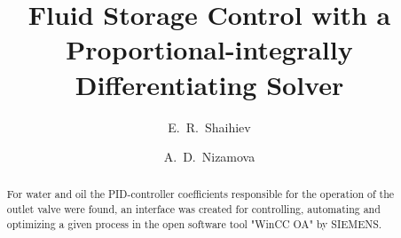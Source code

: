 \begin{englishtitle} %
\title{Fluid Storage Control with a Proportional-integrally Differentiating Solver}
\author{E.~R.~Shaihiev
  \and
  A.~D.~Nizamova
 }

\maketitle

\begin{abstract}
For water and oil the PID-controller coefficients responsible for the operation of the outlet valve were found, an interface was created for controlling, automating and optimizing a given process in the open software tool "WinCC OA" by SIEMENS.

\end{abstract}
\end{englishtitle}

\iffalse

%
%

